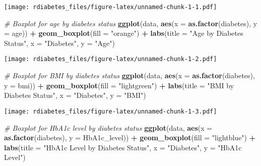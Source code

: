 \documentclass[
]{article}
\newenvironment{Shaded}{\begin{snugshade}}{\end{snugshade}}
\newcommand{\AttributeTok}[1]{\textcolor[rgb]{0.13,0.29,0.53}{#1}}
\newcommand{\CommentTok}[1]{\textcolor[rgb]{0.56,0.35,0.01}{\textit{#1}}}
\newcommand{\FunctionTok}[1]{\textcolor[rgb]{0.13,0.29,0.53}{\textbf{#1}}}
\newcommand{\NormalTok}[1]{#1}
\newcommand{\SpecialCharTok}[1]{\textcolor[rgb]{0.81,0.36,0.00}{\textbf{#1}}}
\newcommand{\StringTok}[1]{\textcolor[rgb]{0.31,0.60,0.02}{#1}}
\begin{document}
\texttt{[image: rdiabetes\_files/figure-latex/unnamed-chunk-1-1.pdf]}

\begin{Shaded}
\begin{Highlighting}[]
\CommentTok{\# Boxplot for age by diabetes status}
\FunctionTok{ggplot}\NormalTok{(data, }\FunctionTok{aes}\NormalTok{(}\AttributeTok{x =} \FunctionTok{as.factor}\NormalTok{(diabetes), }\AttributeTok{y =}\NormalTok{ age)) }\SpecialCharTok{+}
  \FunctionTok{geom\_boxplot}\NormalTok{(}\AttributeTok{fill =} \StringTok{"orange"}\NormalTok{) }\SpecialCharTok{+}
  \FunctionTok{labs}\NormalTok{(}\AttributeTok{title =} \StringTok{"Age by Diabetes Status"}\NormalTok{, }\AttributeTok{x =} \StringTok{"Diabetes"}\NormalTok{, }\AttributeTok{y =} \StringTok{"Age"}\NormalTok{)}
\end{Highlighting}
\end{Shaded}

\texttt{[image: rdiabetes\_files/figure-latex/unnamed-chunk-1-2.pdf]}

\begin{Shaded}
\begin{Highlighting}[]
\CommentTok{\# Boxplot for BMI by diabetes status}
\FunctionTok{ggplot}\NormalTok{(data, }\FunctionTok{aes}\NormalTok{(}\AttributeTok{x =} \FunctionTok{as.factor}\NormalTok{(diabetes), }\AttributeTok{y =}\NormalTok{ bmi)) }\SpecialCharTok{+}
  \FunctionTok{geom\_boxplot}\NormalTok{(}\AttributeTok{fill =} \StringTok{"lightgreen"}\NormalTok{) }\SpecialCharTok{+}
  \FunctionTok{labs}\NormalTok{(}\AttributeTok{title =} \StringTok{"BMI by Diabetes Status"}\NormalTok{, }\AttributeTok{x =} \StringTok{"Diabetes"}\NormalTok{, }\AttributeTok{y =} \StringTok{"BMI"}\NormalTok{)}
\end{Highlighting}
\end{Shaded}

\texttt{[image: rdiabetes\_files/figure-latex/unnamed-chunk-1-3.pdf]}

\begin{Shaded}
\begin{Highlighting}[]
\CommentTok{\# Boxplot for HbA1c level by diabetes status}
\FunctionTok{ggplot}\NormalTok{(data, }\FunctionTok{aes}\NormalTok{(}\AttributeTok{x =} \FunctionTok{as.factor}\NormalTok{(diabetes), }\AttributeTok{y =}\NormalTok{ HbA1c\_level)) }\SpecialCharTok{+}
  \FunctionTok{geom\_boxplot}\NormalTok{(}\AttributeTok{fill =} \StringTok{"lightblue"}\NormalTok{) }\SpecialCharTok{+}
  \FunctionTok{labs}\NormalTok{(}\AttributeTok{title =} \StringTok{"HbA1c Level by Diabetes Status"}\NormalTok{, }\AttributeTok{x =} \StringTok{"Diabetes"}\NormalTok{, }\AttributeTok{y =} \StringTok{"HbA1c Level"}\NormalTok{)}
\end{Highlighting}
\end{Shaded}
\end{document}
